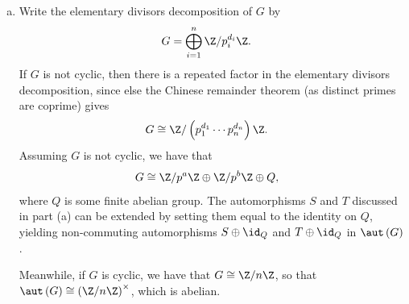 \documentclass[10pt]{mypackage}
\begin{document}
\begin{solution}
\begin{enumerate}[(a)]
      In the general case of $a \geq b > 0$, then we observe that for all $u\in \Z/p^{b}\Z$, we have $\left[ u \right]\in \Z/p^{a}\Z$. Consider the transformations
      \begin{align*}
        \left( u,v \right) &\xmapsto{S} \left( u + \left[ v \right],v \right)\\
        \left( u,v \right) &\xmapsto{T} \left( u,v + \left[ u \right] \right).
      \end{align*}
      First, these are automorphisms since they have inverses defined by
      \begin{align*}
        \left( u,v \right) &\xmapsto{S^{-1}} \left( u-\left[ v \right],v \right)\\
        \left( u,v \right)\xmapsto{T^{-1}}\left( u,v-\left[ u \right] \right).
      \end{align*}
      Then, we observe that
      \begin{align*}
        ST \left( u,v \right) &= S\left( u,v + \left[ u \right]_{p^{b}} \right)\\
                              &= \left( u + \left[ u \right]_{p^{b}} + \left[ v \right],v \right)\\
        TS \left( u,v \right) &= T\left( u + \left[ v \right]_{p^{a}},v \right)\\
                              &= \left( u + \left[ v \right]_{p^{a}},v + \left[ v \right]_{p^{a}} + \left[ u \right]_{p^{b}} \right),
      \end{align*}
      and that $ST\left( 1,1 \right) = \left( \left[ 3 \right],1 \right)$, while $TS\left( 1,1 \right) = \left( \left[ 2 \right],\left[ 3 \right] \right)$.
    \item Write the elementary divisors decomposition of $G$ by
      \begin{align*}
        G &= \bigoplus_{i=1}^{n} \Z/p_i^{d_i}\Z.
      \end{align*}
      If $G$ is not cyclic, then there is a repeated factor in the elementary divisors decomposition, since else the Chinese remainder theorem (as distinct primes are coprime) gives
      \begin{align*}
        G &\cong \Z/\left( p_1^{d_1}\cdots p_n^{d_n} \right)\Z.
      \end{align*}
      Assuming $G$ is not cyclic, we have that
      \begin{align*}
        G &\cong \Z/p^{a}\Z \oplus \Z/p^{b}\Z \oplus Q,
      \end{align*}
      where $Q$ is some finite abelian group. The automorphisms $S$ and $T$ discussed in part (a) can be extended by setting them equal to the identity on $Q$, yielding non-commuting automorphisms $S\oplus \id_Q$ and $T \oplus \id_Q$ in $\aut\left( G \right)$.

      Meanwhile, if $G$ is cyclic, we have that $G\cong \Z/n\Z$, so that $\aut\left( G \right) \cong \left( \Z/n\Z \right)^{\times}$, which is abelian.
  \end{enumerate}
\end{solution}
\end{document}
